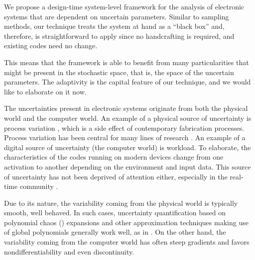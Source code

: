 We propose a design-time system-level framework for the analysis of electronic
systems that are dependent on uncertain parameters. Similar to sampling methods,
our technique treats the system at hand as a ``black box'' and, therefore, is
straightforward to apply since no handcrafting is required, and existing codes
need no change. 

 This means that
the framework is able to benefit from many particularities that might be present
in the stochastic space, that is, the space of the uncertain parameters. The
adaptivity is the capital feature of our technique, and we would like to
elaborate on it now.

The uncertainties present in electronic systems originate from both the physical
world and the computer world. An example of a physical source of uncertainty is
process variation \cite{srivastava2005}, which is a side effect of contemporary
fabrication processes. Process variation has been central for many lines of
research \cite{bhardwaj2008, juan2012, lee2013, ukhov2014, ukhov2015}. An
example of a digital source of uncertainty (the computer world) is workload. To
elaborate, the characteristics of the codes running on modern devices change
from one activation to another depending on the environment and input data. This
source of uncertainty has not been deprived of attention either, especially in
the real-time community \cite{quinton2012, diaz2002, santinelli2011,
tanasa2015}. 


Due to its nature, the variability coming from the physical world is typically
smooth, well behaved. In such cases, uncertainty quantification based on
polynomial chaos () expansions \cite{xiu2010} and other approximation
techniques making use of global polynomials generally work well, as in
\cite{bhardwaj2008, lee2013, ukhov2014, ukhov2015}. On the other hand, the
variability coming from the computer world has often steep gradients and favors
nondifferentiability and even discontinuity. 

